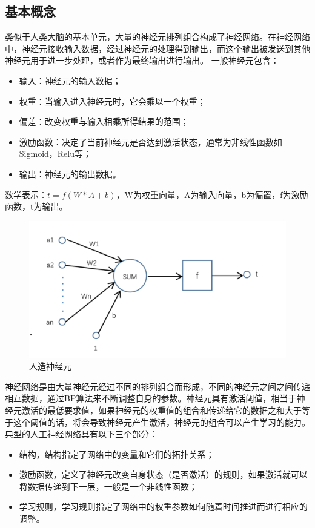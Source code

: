 \subsection{基本概念}
\begin{defn}
  类似于人类大脑的基本单元，大量的神经元排列组合构成了神经网络。在神经网络中，神经元接收输入数据，经过神经元的处理得到输出，而这个输出被发送到其他神经元用于进一步处理，或者作为最终输出进行输出。 
  一般神经元包含：
  \begin{itemize}
    \item 输入：神经元的输入数据；
    \item 权重：当输入进入神经元时，它会乘以一个权重；
    \item 偏差：改变权重与输入相乘所得结果的范围；
    \item 激励函数：决定了当前神经元是否达到激活状态，通常为非线性函数如Sigmoid，Relu等；
    \item 输出：神经元的输出数据。
  \end{itemize}
  数学表示：$t=f(W*A+b)$，W为权重向量，A为输入向量，b为偏置，f为激励函数，t为输出。
  
\end{defn}
\begin{figure}[ht]
  \centering
  \includegraphics[scale=0.4]{static/Ncell.png}
  \caption{人造神经元}
\end{figure}

\begin{defn}[神经网络]
  神经网络是由大量神经元经过不同的排列组合而形成，不同的神经元之间之间传递相互数据，通过BP算法来不断调整自身的参数。神经元具有激活阈值，相当于神经元激活的最低要求值，如果神经元的权重值的组合和传递给它的数据之和大于等于这个阈值的话，将会导致神经元产生激活，神经元的组合可以产生学习的能力。
  典型的人工神经网络具有以下三个部分：
  \begin{itemize}
    \item 结构，结构指定了网络中的变量和它们的拓扑关系；
    \item 激励函数，定义了神经元改变自身状态（是否激活）的规则，如果激活就可以将数据传递到下一层，一般是一个非线性函数；
    \item 学习规则，学习规则指定了网络中的权重参数如何随着时间推进而进行相应的调整。
  \end{itemize}
  
\end{defn}

